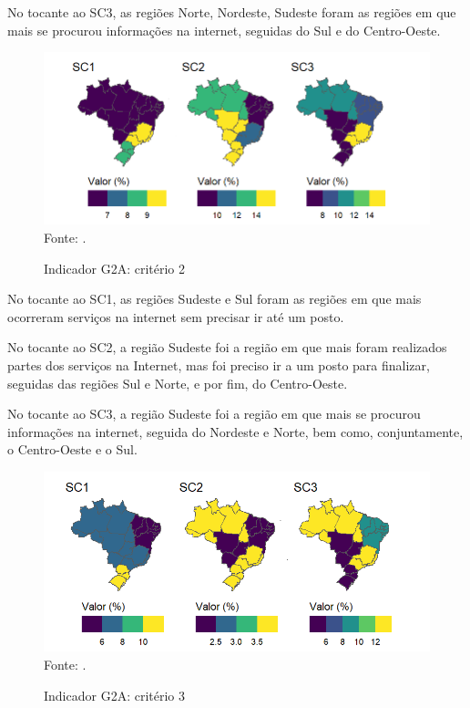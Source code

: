 No tocante ao SC3, as regiões Norte, Nordeste, Sudeste foram as regiões em que mais se procurou informações na internet, seguidas do Sul e do Centro-Oeste.

\begin{figure}[H]
	\centering
	\caption{Indicador G2A: critério 2}
	\includegraphics[width=1\linewidth]{figuras/mapa_coropletico_tic_domicilios_2024_g2a_2.png}
	\label{fig:mapa_coropletico_tic_domicilios_2024_g2a_2}
	\footnotesize{Fonte: \cite{tic_domicilios_2024_g2a}.}
\end{figure}

No tocante ao SC1, as regiões Sudeste e Sul foram as regiões em que mais ocorreram serviços na internet sem precisar ir até um posto.

No tocante ao SC2, a região Sudeste foi a região em que mais foram realizados partes dos serviços na Internet, mas foi preciso ir a um posto para finalizar, seguidas  das regiões Sul e Norte, e por fim, do Centro-Oeste.

No tocante ao SC3, a região Sudeste foi a região em que mais se procurou informações na internet, seguida do Nordeste e Norte, bem como, conjuntamente, o Centro-Oeste e o Sul.

\begin{figure}[H]
	\centering
	\caption{Indicador G2A: critério 3}
	\includegraphics[width=1\linewidth]{figuras/mapa_coropletico_tic_domicilios_2024_g2a_3.png}
	\label{fig:mapa_coropletico_tic_domicilios_2024_g2a_3}
	\footnotesize{Fonte: \cite{tic_domicilios_2024_g2a}.}
\end{figure}

